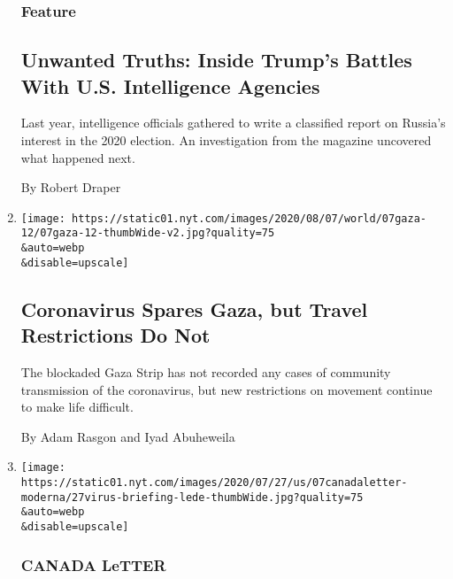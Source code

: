 \begin{enumerate}
  \hypertarget{feature}{%
  \subsubsection{Feature}\label{feature}}

  \hypertarget{unwanted-truths-inside-trumps-battles-with-us-intelligence-agencies}{%
  \subsection{Unwanted Truths: Inside Trump's Battles With U.S.
  Intelligence
  Agencies}\label{unwanted-truths-inside-trumps-battles-with-us-intelligence-agencies}}

  Last year, intelligence officials gathered to write a classified
  report on Russia's interest in the 2020 election. An investigation
  from the magazine uncovered what happened next.

  By Robert Draper
\item
  \href{/2020/08/08/world/middleeast/coronavirus-gaza.html}{}

  \texttt{[image: https://static01.nyt.com/images/2020/08/07/world/07gaza-12/07gaza-12-thumbWide-v2.jpg?quality=75\\\&auto=webp\\\&disable=upscale]}

  \hypertarget{coronavirus-spares-gaza-but-travel-restrictions-do-not}{%
  \subsection{Coronavirus Spares Gaza, but Travel Restrictions Do
  Not}\label{coronavirus-spares-gaza-but-travel-restrictions-do-not}}

  The blockaded Gaza Strip has not recorded any cases of community
  transmission of the coronavirus, but new restrictions on movement
  continue to make life difficult.

  By Adam Rasgon and Iyad Abuheweila
\item
  \href{/2020/08/07/world/canada/canada-letter-vaccine.html}{}

  \texttt{[image: https://static01.nyt.com/images/2020/07/27/us/07canadaletter-moderna/27virus-briefing-lede-thumbWide.jpg?quality=75\\\&auto=webp\\\&disable=upscale]}

  \hypertarget{canada-letter}{%
  \subsubsection{CANADA LeTTER}\label{canada-letter}}


\end{enumerate}
